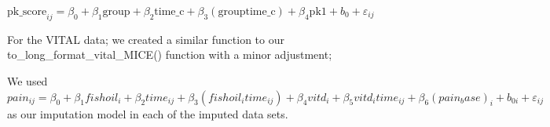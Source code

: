 \documentclass{article}
\newenvironment{Shaded}{\begin{snugshade}}{\end{snugshade}}
\newcommand{\AttributeTok}[1]{\textcolor[rgb]{0.13,0.29,0.53}{#1}}
\newcommand{\ControlFlowTok}[1]{\textcolor[rgb]{0.13,0.29,0.53}{\textbf{#1}}}
\newcommand{\DecValTok}[1]{\textcolor[rgb]{0.00,0.00,0.81}{#1}}
\newcommand{\FunctionTok}[1]{\textcolor[rgb]{0.13,0.29,0.53}{\textbf{#1}}}
\newcommand{\NormalTok}[1]{#1}
\newcommand{\OtherTok}[1]{\textcolor[rgb]{0.56,0.35,0.01}{#1}}
\newcommand{\SpecialCharTok}[1]{\textcolor[rgb]{0.81,0.36,0.00}{\textbf{#1}}}
\newcommand{\StringTok}[1]{\textcolor[rgb]{0.31,0.60,0.02}{#1}}
\begin{document}
\(\text{pk\_score}_{ij} = \beta_0 + \beta_1 \text{group} + \beta_2  \text{time\_c} + \beta_3  (\text{group}  \text{time\_c}) + \beta_4  \text{pk1} + b_0 + \varepsilon_{ij}\)

\newpage

For the VITAL data; we created a similar function to our
to\_long\_format\_vital\_MICE() function with a minor adjustment;

\begin{Shaded}
\end{Shaded}

We used
\(pain_{ij}=\beta_0+\beta_1fishoil_i+\beta_2time_{ij}+\beta_3(fishoil_itime_{ij})+\beta_4vitd_i+\beta_5vitd_itime_{ij}+\beta_6(pain_base)_i+b_{0i}+\varepsilon_{ij}\)
as our imputation model in each of the imputed data sets.
\end{document}

